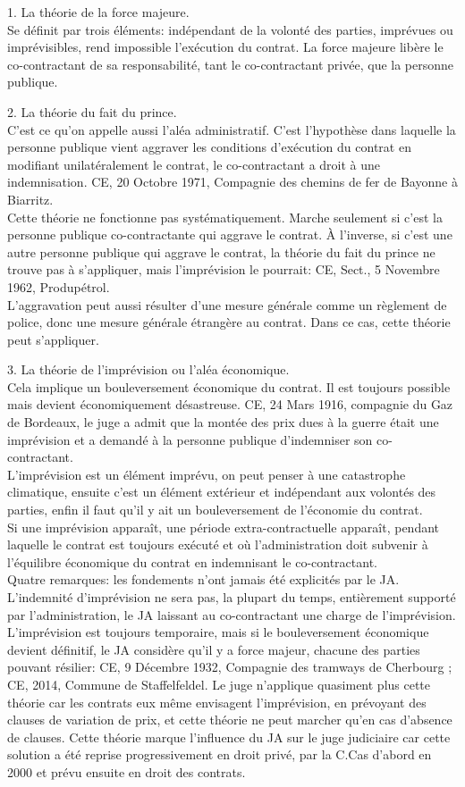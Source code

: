 \documentclass[10pt, a4paper, openany]{book}
\begin{document}
1. La théorie de la force majeure. \\
Se définit par trois éléments: indépendant de la volonté des parties, imprévues ou imprévisibles, rend impossible l'exécution du contrat. La force majeure libère le co-contractant de sa responsabilité, tant le co-contractant privée, que la personne publique.


2. La théorie du fait du prince. \\
C'est ce qu'on appelle aussi l'aléa administratif. C'est l'hypothèse dans laquelle la personne publique vient aggraver les conditions d'exécution du contrat en modifiant unilatéralement le contrat, le co-contractant a droit à une indemnisation. CE, 20 Octobre 1971, Compagnie des chemins de fer de Bayonne à Biarritz. \\
Cette théorie ne fonctionne pas systématiquement. Marche seulement si c'est la personne publique co-contractante qui aggrave le contrat. À l'inverse, si c'est une autre personne publique qui aggrave le contrat, la théorie du fait du prince ne trouve pas à s'appliquer, mais l'imprévision le pourrait: CE, Sect., 5 Novembre 1962, Produpétrol. \\
L'aggravation peut aussi résulter d'une mesure générale comme un règlement de police, donc une mesure générale étrangère au contrat. Dans ce cas, cette théorie peut s'appliquer. 


3. La théorie de l'imprévision ou l'aléa économique. \\
Cela implique un bouleversement économique du contrat. Il est toujours possible mais devient économiquement désastreuse. CE, 24 Mars 1916, compagnie du Gaz de Bordeaux, le juge a admit que la montée des prix dues à la guerre était une imprévision et a demandé à la personne publique d'indemniser son co-contractant. \\
L'imprévision est un élément imprévu, on peut penser à une catastrophe climatique, ensuite c'est un élément extérieur et indépendant aux volontés des parties, enfin il faut qu'il y ait un bouleversement de l'économie du contrat. \\
Si une imprévision apparaît, une période extra-contractuelle apparaît, pendant laquelle le contrat est toujours exécuté et où l'administration doit subvenir à l'équilibre économique du contrat en indemnisant le co-contractant. \\
Quatre remarques: les fondements n'ont jamais été explicités par le JA. L'indemnité d'imprévision ne sera pas, la plupart du temps, entièrement supporté par l'administration, le JA laissant au co-contractant une charge de l'imprévision. L'imprévision est toujours temporaire, mais si le bouleversement économique devient définitif, le JA considère qu'il y a force majeur, chacune des parties pouvant résilier: CE, 9 Décembre 1932, Compagnie des tramways de Cherbourg ; CE, 2014, Commune de Staffelfeldel. Le juge n'applique quasiment plus cette théorie car les contrats eux même envisagent l'imprévision, en prévoyant des clauses de variation de prix, et cette théorie ne peut marcher qu'en cas d'absence de clauses. Cette théorie marque l'influence du JA sur le juge judiciaire car cette solution a été reprise progressivement en droit privé, par la C.Cas d'abord en 2000 et prévu ensuite en droit des contrats. 
\end{document}
